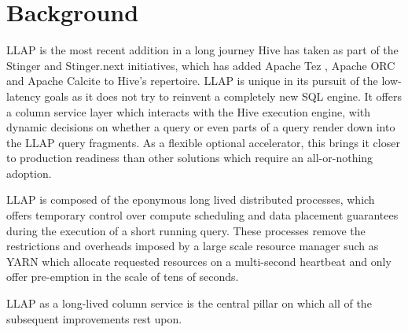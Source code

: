 \section{Background}

LLAP is the most recent addition in a long journey Hive has taken as part of the Stinger and Stinger.next initiatives, which has added 
Apache Tez \cite{tez}, Apache ORC \cite{orc} and Apache Calcite \cite{cbo} to Hive's repertoire.
LLAP is unique in its pursuit of the low-latency goals as it does not try to reinvent a completely new SQL engine. It offers a column service 
layer which interacts with the Hive execution engine, with dynamic decisions on whether a query or even parts of a query render down 
into the LLAP query fragments. As a flexible optional accelerator, this brings it closer to production readiness than other solutions
which require an all-or-nothing adoption. 

LLAP is composed of the eponymous long lived distributed processes, which offers temporary 
control over compute scheduling and data placement guarantees during the execution of a short running 
query. These processes remove the restrictions and overheads imposed by a large scale resource manager
such as YARN\cite{YARN} which allocate requested resources on a multi-second heartbeat and only offer
pre-emption in the scale of tens of seconds.

LLAP as a long-lived column service is the central pillar on which all of the subsequent improvements
rest upon. 
